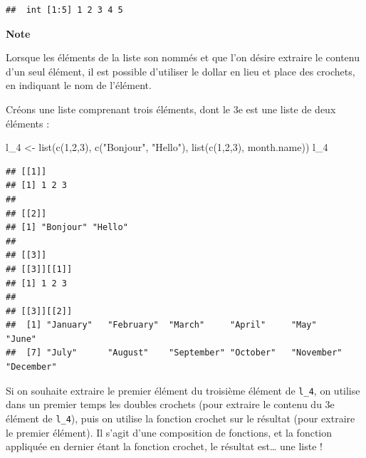 \documentclass[
  11pt,
]{book}
\newenvironment{Shaded}{\begin{snugshade}}{\end{snugshade}}
\newcommand{\DecValTok}[1]{\textcolor[rgb]{0.00,0.00,0.81}{#1}}
\newcommand{\FunctionTok}[1]{\textcolor[rgb]{0.00,0.00,0.00}{#1}}
\newcommand{\NormalTok}[1]{#1}
\newcommand{\OtherTok}[1]{\textcolor[rgb]{0.56,0.35,0.01}{#1}}
\newcommand{\SpecialCharTok}[1]{\textcolor[rgb]{0.00,0.00,0.00}{#1}}
\newcommand{\StringTok}[1]{\textcolor[rgb]{0.31,0.60,0.02}{#1}}
\numberwithin{equation}{section}
\numberwithin{countremarque}{section}
\newenvironment{notebox}{
  \begin{tcolorbox}[breakable, colback=jaune,coltext=black,
                  colframe=grisfonce]}
 {\end{tcolorbox}}
\begin{document}
\begin{lstlisting}
##  int [1:5] 1 2 3 4 5
\end{lstlisting}

\begin{notebox}

\textbf{Note}

Lorsque les éléments de la liste son nommés et que l'on désire extraire le contenu d'un seul élément, il est possible d'utiliser le dollar en lieu et place des crochets, en indiquant le nom de l'élément.

\begin{Shaded}
\end{Shaded}

\end{notebox}

Créons une liste comprenant trois éléments, dont le 3e est une liste de deux éléments :

\begin{Shaded}
\begin{Highlighting}[]
\NormalTok{l\_4 }\OtherTok{\textless{}{-}} 
  \FunctionTok{list}\NormalTok{(}\FunctionTok{c}\NormalTok{(}\DecValTok{1}\NormalTok{,}\DecValTok{2}\NormalTok{,}\DecValTok{3}\NormalTok{),}
     \FunctionTok{c}\NormalTok{(}\StringTok{"Bonjour"}\NormalTok{, }\StringTok{"Hello"}\NormalTok{),}
     \FunctionTok{list}\NormalTok{(}\FunctionTok{c}\NormalTok{(}\DecValTok{1}\NormalTok{,}\DecValTok{2}\NormalTok{,}\DecValTok{3}\NormalTok{), month.name))}
\NormalTok{l\_4}
\end{Highlighting}
\end{Shaded}

\begin{lstlisting}
## [[1]]
## [1] 1 2 3
## 
## [[2]]
## [1] "Bonjour" "Hello"  
## 
## [[3]]
## [[3]][[1]]
## [1] 1 2 3
## 
## [[3]][[2]]
##  [1] "January"   "February"  "March"     "April"     "May"       "June"     
##  [7] "July"      "August"    "September" "October"   "November"  "December"
\end{lstlisting}

Si on souhaite extraire le premier élément du troisième élément de \texttt{l\_4}, on utilise dans un premier temps les doubles crochets (pour extraire le contenu du 3e élément de \texttt{l\_4}), puis on utilise la fonction crochet sur le résultat (pour extraire le premier élément). Il s'agit d'une composition de fonctions, et la fonction appliquée en dernier étant la fonction crochet, le résultat est\ldots{} une liste !
\end{document}
